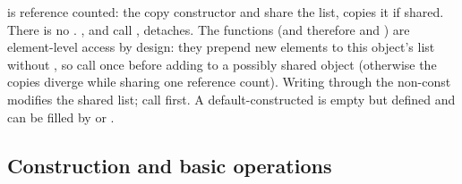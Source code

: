  is reference counted: the copy constructor and  share the list,
 copies it if shared. There is no .
,  and  call ,  detaches.
The  functions (and therefore  and ) are element-level access by design:
they prepend new elements to this object's list without , so call  once
before adding to a possibly shared object (otherwise the copies diverge while sharing one reference count).
Writing through the non-const  modifies the shared list; call  first.
A default-constructed  is empty but defined and can be filled by  or .

\subsection{Construction and basic operations}

